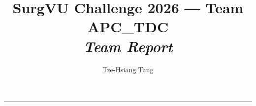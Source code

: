 \documentclass{article}
\title{SurgVU Challenge 2026 --- Team \textbf{APC\_TDC}\\[0.5em]
\large \textit{Team Report}}
\date{}
\author[1]{Tze-Hsiang Tang}
\affil[1]{Schneider Electric Taiwan Co., Ltd., Taipei, Taiwan}
\begin{document}
\maketitle

\bigskip
\hrule
\bigskip



\clearpage


\end{document}
